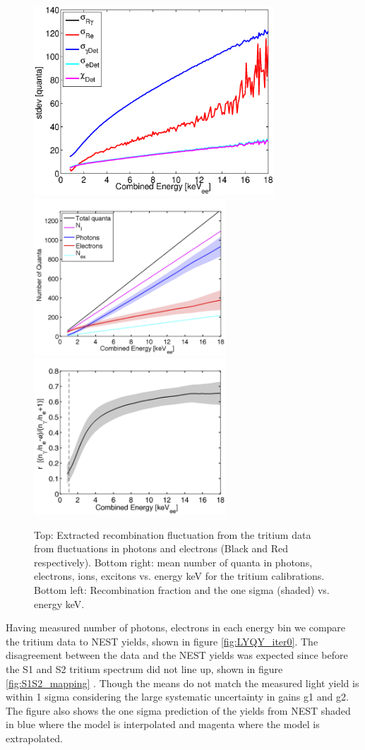  \begin{figure}[p!]\centering
 \includegraphics[width=90mm]{Chapter_Flucs/Figures/Iter0/std_fig_.eps}
 \includegraphics[width=72mm]{Chapter_Flucs/Figures/Iter0/quanta_.png}
 \includegraphics[width=72mm]{Chapter_Flucs/Figures/Iter0/R_.png}
\caption{Top: Extracted recombination fluctuation from the tritium data from fluctuations in photons and electrons (Black and Red respectively). Bottom right: mean number of quanta in photons, electrons, ions, excitons vs. energy keV for the tritium calibrations. Bottom left: Recombination fraction and the one sigma (shaded) vs. energy keV.}
\label{fig:Rec_0}
\end{figure}

Having measured number of photons, electrons in each energy bin we compare the tritium data to NEST yields, shown in figure \ref{fig:LYQY_iter0}. The disagreement between the data and the NEST yields was expected since before the S1 and S2 tritium spectrum did not line up, shown in figure \ref{fig:S1S2_mapping} . Though the means do not match the measured light yield is within 1 sigma considering the large systematic uncertainty in gains g1 and g2.  The figure also shows the one sigma prediction of the yields from NEST \cite{NEST_2013} shaded in blue where the model is interpolated and magenta where the model is extrapolated. 


